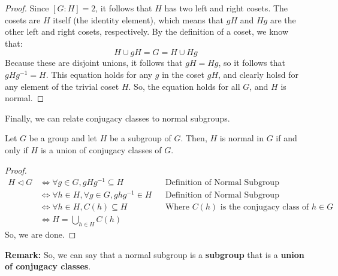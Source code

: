 \documentclass[letterpaper]{article}
\begin{document}
\begin{mdframed}
    \begin{proof}
        Since $[G: H] = 2$, it follows that $H$ has two left and right cosets. The cosets are $H$ itself (the identity element), which means that $gH$ and $Hg$ are the other left and right cosets, respectively. By the definition of a coset, we know that: 
        \[H \cup gH = G = H \cup Hg\]
        Because these are disjoint unions, it follows that $gH = Hg$, so it follows that $gHg^{-1} = H$. This equation holds for any $g$ in the coset $gH$, and clearly holsd for any element of the trivial coset $H$. So, the equation holds for all $G$, and $H$ is normal. 
    \end{proof}
\end{mdframed}

Finally, we can relate conjugacy classes to normal subgroups. 
\begin{theorem}{}{}
    Let $G$ be a group and let $H$ be a subgroup of $G$. Then, $H$ is normal in $G$ if and only if $H$ is a union of conjugacy classes of $G$.
\end{theorem}

\begin{mdframed}
    \begin{proof}
        \begin{equation*}
            \begin{aligned}
                H \triangleleft G &\iff \forall g \in G, gHg^{-1} \subseteq H && \text{Definition of Normal Subgroup} \\ 
                    &\iff \forall h \in H, \forall g \in G, ghg^{-1} \in H && \text{Definition of Normal Subgroup} \\ 
                    &\iff \forall h \in H, C(h) \subseteq H && \text{Where } C(h) \text{ is the conjugacy class of } h \in G  \\ 
                    &\iff H = \bigcup_{h \in H} C(h)
            \end{aligned}
        \end{equation*}
        So, we are done. 
    \end{proof}
\end{mdframed}
\textbf{Remark:} So, we can say that a normal subgroup is a \textbf{subgroup} that is a \textbf{union of conjugacy classes}. 
\end{document}
